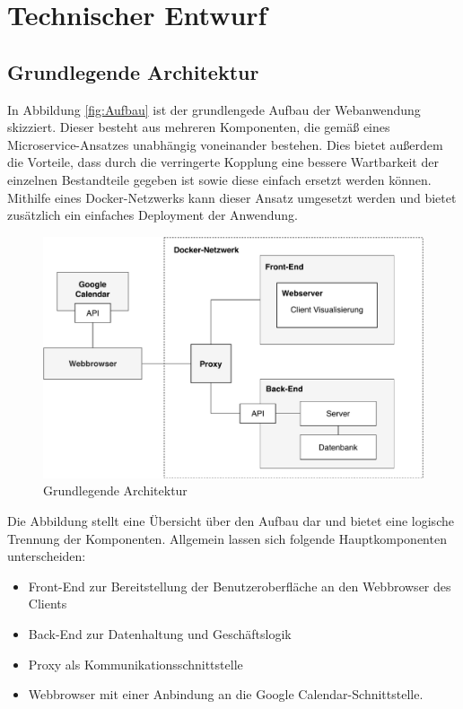 \section{Technischer Entwurf}
\label{ch:Technischer Entwurf}
\subsection{Grundlegende Architektur}
\label{ch:grundlegendeArchitektur}
In Abbildung \vref{fig:Aufbau} ist der grundlengede Aufbau der Webanwendung skizziert.
Dieser besteht aus mehreren Komponenten, die gemäß eines Microservice-Ansatzes unabhängig voneinander bestehen. 
Dies bietet außerdem die Vorteile, dass durch die verringerte Kopplung eine bessere Wartbarkeit der einzelnen Bestandteile gegeben ist sowie diese einfach ersetzt werden können. 
Mithilfe eines Docker-Netzwerks kann dieser Ansatz umgesetzt werden und bietet zusätzlich ein einfaches Deployment der Anwendung. 

\begin{figure}[H]
	\centering 
	\includegraphics[width=13cm]{img/TechnischerEntwurf.pdf}
	\caption[Grundlegende Architektur]{\label{fig:Aufbau}Grundlegende Architektur}
\end{figure}

Die Abbildung stellt eine Übersicht über den Aufbau dar und bietet eine logische Trennung der Komponenten. 
Allgemein lassen sich folgende Hauptkomponenten unterscheiden:
\begin{itemize}
    \item Front-End zur Bereitstellung der Benutzeroberfläche an den Webbrowser des Clients 
    \item Back-End zur Datenhaltung und Geschäftslogik
    \item Proxy als Kommunikationsschnittstelle
    \item Webbrowser mit einer Anbindung an die Google Calendar-Schnittstelle.
\end{itemize} 

